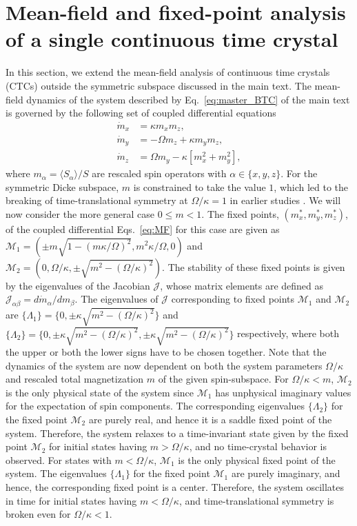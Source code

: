 \documentclass[pra,aps,twocolumn,superscriptaddress,notitlepage]{revtex4-1}
\begin{document}
	\section{Mean-field and fixed-point analysis of a single continuous time crystal}
	In this section, we extend the mean-field analysis of continuous time crystals (CTCs) outside the symmetric subspace discussed in the main text.
	The mean-field dynamics of the system described by Eq.~\eqref{eq:master_BTC} of the main text is governed by the following set of coupled differential equations
	\begin{align} \label{eq:MF}
	\dot{m}_x&=\kappa m_x m_z, \nonumber\\ 
	\dot{m}_y&= -\Omega m_z+ \kappa m_y m_z, \\ 
	\dot{m}_z&= \Omega m_y- \kappa [m_x^2+m_y^2],\nonumber
	\end{align}
	where $m_\alpha=\langle S_\alpha \rangle/S$ are rescaled spin operators with $\alpha\in \{x,y,z\}$.
	For the symmetric Dicke subspace, $m$ is constrained to take the value $1$, which led to the breaking of time-translational symmetry at $\Omega/\kappa=1$ in earlier studies \cite{iemini2018boundary,seeding2022michal}.
	We will now consider the more general case $0 \leq m < 1$. 
	The fixed points, $(m_x^*,m_y^*,m_z^*)$, of the coupled differential Eqs.~\eqref{eq:MF} for this case are given as $\mathcal{M}_1 = (\pm m\sqrt{1-(m\kappa/\Omega)^2},m^2 \kappa/\Omega,0)$ and $\mathcal{M}_2 = (0,\Omega/\kappa,\pm \sqrt{m^2-(\Omega/\kappa)^2})$.
	The stability of these fixed points is given by the eigenvalues of the Jacobian $\mathcal{J}$, whose matrix elements are defined as $\mathcal{J}_{\alpha\beta}=d \dot{m}_\alpha/dm_\beta$.
	The eigenvalues of $\mathcal{J}$ corresponding to fixed points $\mathcal{M}_1$ and $\mathcal{M}_2$ are  $\{\Lambda_1\}=\{0,\pm \kappa \sqrt{m^2-(\Omega/\kappa)^2}\}$ and $\{\Lambda_2\}=\{0, \pm \kappa \sqrt{m^2-(\Omega/\kappa)^2},\pm \kappa \sqrt{m^2-(\Omega/\kappa)^2}\}$ respectively, where both the upper or both the lower signs have to be chosen together.
	Note that the dynamics of the system are now dependent on both the system parameters $\Omega/\kappa$ and rescaled total magnetization $m$ of the given spin-subspace. 
	For $\Omega/\kappa<m$, $\mathcal{M}_2$ is the only physical state of the system since $\mathcal{M}_1$ has unphysical imaginary values for the expectation of spin components. 
	The corresponding eigenvalues $\{\Lambda_2\}$ for the fixed point $\mathcal{M}_2$ are purely real, and hence it is a  saddle fixed point of the system. 
	Therefore, the system relaxes to a time-invariant state given by the fixed point $\mathcal{M}_2$ for initial states having $m>\Omega/\kappa$, and no time-crystal behavior is observed.
	For states with $m<\Omega/\kappa$, $\mathcal{M}_1$ is the only physical fixed point of the system.  The eigenvalues $\{\Lambda_1\}$ for the fixed point $\mathcal{M}_1$ are purely imaginary, and hence, the corresponding fixed point is a center. 
	Therefore, the system oscillates in time for initial states having $m<\Omega/\kappa$, and time-translational symmetry is broken even for $\Omega/\kappa<1$. 
	
\end{document}
